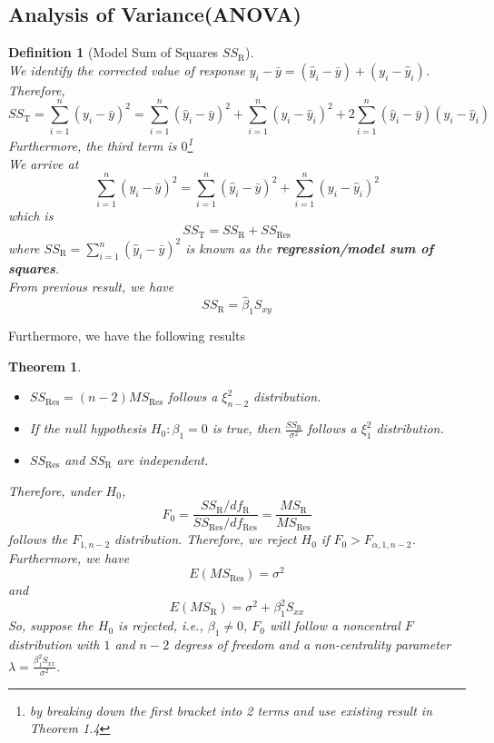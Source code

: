 \documentclass[12pt]{article}
\newtheorem{definition}{Definition}[section]
\newtheorem{theorem}{Theorem}[section]
\theoremstyle{definition}
\begin{document}
\subsection{Analysis of Variance(ANOVA)}
\begin{definition}[Model Sum of Squares {$SS_\text{R}$}]
\hfill\\\normalfont We identify the corrected value of response $y_i-\bar{y} = (\hat{y}_i - \bar{y}) + (y_i-\hat{y}_i)$. Therefore,
\[
SS_\text{T} = \sum_{i=1}^n (y_i-\bar{y})^2 = \sum_{i=1}^n (\hat{y}_i - \bar{y})^2 +  \sum_{i=1}^n (y_i-\hat{y}_i)^2 +2\sum_{i=1}^n (\hat{y}_i - \bar{y}) (y_i-\hat{y}_i)
\]
Furthermore, the third term is $0$\footnote{by breaking down the first bracket into 2 terms and use existing result in Theorem 1.4}\\
We arrive at
\[
\sum_{i=1}^n (y_i-\bar{y})^2 = \sum_{i=1}^n (\hat{y}_i - \bar{y})^2  +  \sum_{i=1}^n (y_i-\hat{y}_i)^2 
\]
which is
\[
SS_\text{T} = SS_\text{R}+SS_\text{Res}
\]
where $SS_\text{R} = \sum_{i=1}^n (\hat{y}_i - \bar{y})^2 $ is known as the \textbf{regression/model sum of squares}.\\
From previous result, we have 
\[
SS_\text{R} = \hat{\beta}_1 S_{xy}
\] 
\end{definition}
Furthermore, we have the following results
\begin{theorem}
\hfill\\\normalfont \begin{itemize}
\item $SS_\text{Res} = (n-2) MS_\text{Res}$ follows a $\xi_{n-2}^2$ distribution.
\item If the null hypothesis $H_0:\beta_1=0$ is true, then $\frac{SS_\text{R}}{\sigma^2}$ follows a $\xi_1^2$ distribution.
\item $SS_\text{Res}$ and $SS_\text{R}$ are independent.
\end{itemize}
Therefore, under $H_0$, 
\[
F_0 = \frac{SS_\text{R}/df_\text{R}}{SS_\text{Res}/df_\text{Res}} = \frac{MS_\text{R}}{MS_\text{Res}}
\]
follows the $F_{1,n-2}$ distribution.
Therefore, we reject $H_0$ if $F_0> F_{\alpha, 1, n-2}$.
Furthermore, we have
\[
E(MS_\text{Res}) = \sigma^2
\]
and
\[
E(MS_\text{R}) = \sigma^2+\beta_1^2 S_{xx}
\]
So, suppose the $H_0$ is rejected, i.e., $\beta_1\neq 0$, $F_0$ will follow a noncentral $F$ distribution with $1$ and $n-2$ degress of freedom and a non-centrality parameter $\lambda=\frac{\beta_1^2 S_{xx}}{\sigma^2}$.
\end{theorem}
\end{document}
